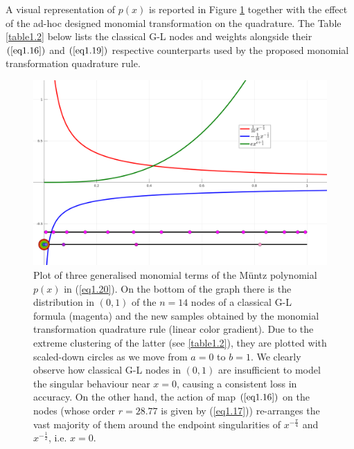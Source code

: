 \documentclass[a4paper, twosided]{book}
\begin{document}
\noindent
A visual representation of $p(x)$ is reported in Figure \ref{Fig1.2} together with the effect of the ad-hoc designed monomial transformation on the quadrature. The Table \ref{table1.2} below lists the classical G-L nodes and weights alongside their $(\ref{eq1.16})$ and $(\ref{eq1.19})$ respective counterparts used by the proposed monomial transformation quadrature rule.
\vspace{0.5cm}
\begin{center}
        \begin{figure}[h]
        \captionsetup{singlelinecheck=off}
        \includegraphics[keepaspectratio,width=\textwidth]{images/GenPolyMonMap.png}
        \caption{Plot of three generalised monomial terms of the Müntz polynomial $p(x)$ in (\ref{eq1.20}). On the bottom of the graph there is the distribution in $(0,1)$ of the $n=14$ nodes of a classical G-L formula (magenta) and the new samples obtained by the monomial transformation quadrature rule (linear color gradient). Due to the extreme clustering of the latter (see \ref{table1.2}), they are plotted with scaled-down circles as we move from $a=0$ to $b=1$. We clearly observe how classical G-L nodes in $(0,1)$ are insufficient to model the singular behaviour near $x=0$, causing a consistent loss in accuracy. On the other hand, the action of map $(\ref{eq1.16})$ on the nodes (whose order $r=28.77$ is given by (\ref{eq1.17})) re-arranges the vast majority of them around the endpoint singularities of $x^{-\frac{\pi}{4}}$ and $x^{-\frac{1}{2}}$, i.e. $x=0$.}
        \label{Fig1.2}
        \end{figure}
\end{center}

\newpage
\end{document}

